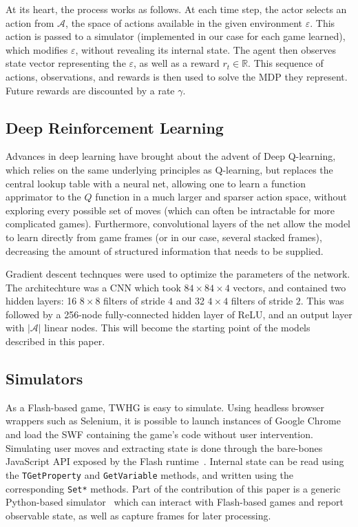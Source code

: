 \documentclass[12pt]{article}
\begin{document}
At its heart, the process works as follows. At each time step, the actor selects an action from $\mathcal{A}$, the space of actions available in the given environment $\varepsilon$. This action is passed to a simulator (implemented in our case for each game learned), which modifies $\varepsilon$, without revealing its internal state. The agent then observes state vector representing the $\varepsilon$, as well as a reward $r_t \in \mathbb{R}$. This sequence of actions, observations, and rewards is then used to solve the MDP they represent. Future rewards are discounted by a rate $\gamma$.

\subsection{Deep Reinforcement Learning}

Advances in deep learning have brought about the advent of Deep Q-learning, which relies on the same underlying principles as Q-learning, but replaces the central lookup table with a neural net, allowing one to learn a function apprimator to the $Q$ function in a much larger and sparser action space, without exploring every possible set of moves (which can often be intractable for more complicated games). Furthermore, convolutional layers of the net allow the model to learn directly from game frames (or in our case, several stacked frames), decreasing the amount of structured information that needs to be supplied.

Gradient descent technques were used to optimize the parameters of the network. The architechture was a CNN which took $84 \times 84 \times 4$ vectors, and contained two hidden layers: 16 $8 \times 8$ filters of stride $4$ and 32 $4 \times 4$ filters of stride $2$. This was followed by a 256-node fully-connected hidden layer of ReLU, and an output layer with $|\mathcal{A}|$ linear nodes. This will become the starting point of the models described in this paper.

\subsection{Simulators}

As a Flash-based game, TWHG is easy to simulate. Using headless browser wrappers such as Selenium, it is possible to launch instances of Google Chrome and load the SWF containing the game's code without user intervention. Simulating user moves and extracting state is done through the bare-bones JavaScript API exposed by the Flash runtime~\cite{flashjs}. Internal state can be read using the \texttt{TGetProperty} and \texttt{GetVariable} methods, and written using the corresponding \texttt{Set*} methods. Part of the contribution of this paper is a generic Python-based simulator~\cite{simulator} which can interact with Flash-based games and report observable state, as well as capture frames for later processing.
\end{document}
